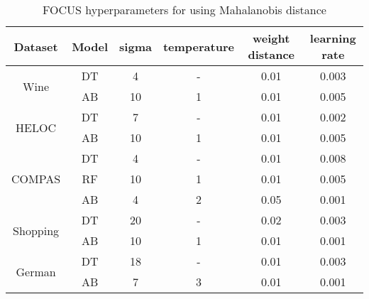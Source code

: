 \begin{table}[t!]
\centering
\begin{tabular}{cccccc}
Dataset                   & Model & sigma & temperature & weight distance & learning rate \\ \hline
\multirow{2}{*}{Wine}     & DT    & 4     & -           & 0.01            & 0.003         \\
                          & AB    & 10    & 1           & 0.01            & 0.005         \\ \hline
\multirow{2}{*}{HELOC}    & DT    & 7     & -           & 0.01            & 0.002         \\
                          & AB    & 10    & 1           & 0.01            & 0.005         \\ \hline
\multirow{3}{*}{COMPAS}   & DT    & 4     & -          & 0.01            & 0.008         \\
                          & RF    & 10    & 1           & 0.01            & 0.005         \\
                          & AB    & 4     & 2           & 0.05            & 0.001         \\ \hline
\multirow{2}{*}{Shopping} & DT    & 20    & -           & 0.02            & 0.003         \\
                          & AB    & 10    & 1           & 0.01            & 0.001         \\ \hline
\multirow{2}{*}{German}   & DT    & 18    & -           & 0.01            & 0.003         \\
                          & AB    & 7     & 3           & 0.01            & 0.001         \\ \hline
\end{tabular}
\caption{FOCUS hyperparameters for using Mahalanobis distance}
\label{table:mahal params}
\end{table}

